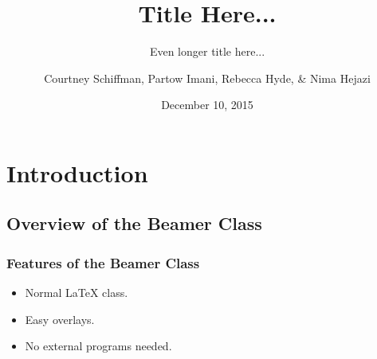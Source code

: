 \documentclass{beamer}
\title{Title Here...}
\subtitle{Even longer title here...}
\author{Courtney Schiffman, Partow Imani, Rebecca Hyde, \& Nima Hejazi}
\institute[UC Berkeley]{University of California, Berkeley}
\date{December 10, 2015}
\begin{document}
\frame{\titlepage}

\section[Outline]{}
\frame{\tableofcontents}

\section{Introduction}
\subsection{Overview of the Beamer Class}
\frame
{
  \frametitle{Features of the Beamer Class}

  \begin{itemize}
  \item<1-> Normal LaTeX class.
  \item<2-> Easy overlays.
  \item<3-> No external programs needed.      
  \end{itemize}
}
\end{document}
